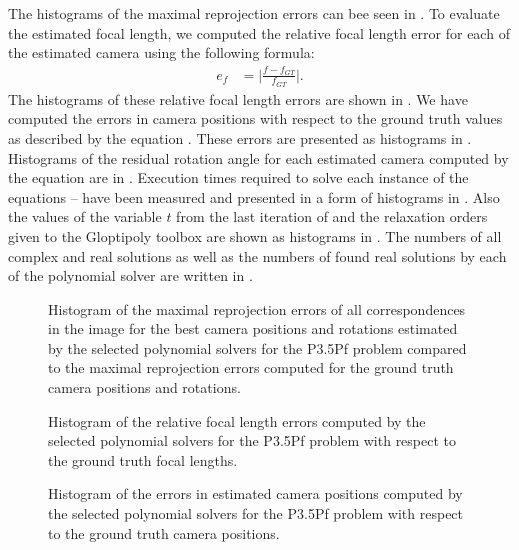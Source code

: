 The histograms of the maximal reprojection errors can bee seen in .
To evaluate the estimated focal length, we computed the relative focal length error for each of the estimated camera using the following formula:
\begin{align}
  e_f &= \bigg|\frac{f-f_{GT}}{f_{GT}}\bigg|.
\end{align}
The histograms of these relative focal length errors are shown in .
We have computed the errors in camera positions with respect to the ground truth values as described by the equation .
These errors are presented as histograms in .
Histograms of the residual rotation angle for each estimated camera computed by the equation  are in .
Execution times required to solve each instance of the equations  --  have been measured and presented in a form of histograms in .
Also the values of the variable $t$ from the last iteration of  and the relaxation orders given to the Gloptipoly toolbox are shown as histograms in .
The numbers of all complex and real solutions as well as the numbers of found real solutions by each of the polynomial solver are written in .

\begin{figure}[ht]
  \centering
  \resizebox{0.95\textwidth}{!}{}
  \caption{Histogram of the maximal reprojection errors of all correspondences in the image for the best camera positions and rotations estimated by the selected polynomial solvers for the P3.5Pf problem compared to the maximal reprojection errors computed for the ground truth camera positions and rotations.}
\end{figure}

\begin{figure}[ht]
  \centering
  \resizebox{0.95\textwidth}{!}{}
  \caption{Histogram of the relative focal length errors computed by the selected polynomial solvers for the P3.5Pf problem with respect to the ground truth focal lengths.}
\end{figure}

\begin{figure}[ht]
  \centering
  \resizebox{0.95\textwidth}{!}{}
  \caption{Histogram of the errors in estimated camera positions computed by the selected polynomial solvers for the P3.5Pf problem with respect to the ground truth camera positions.}
\end{figure}

